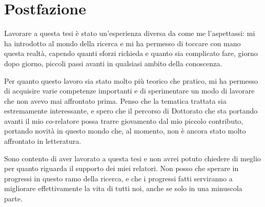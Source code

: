 \cleardoublepage
\renewcommand{\headrulewidth}{0pt}
\rhead{}
\thispagestyle{plain}
\begingroup
\let\clearpage\endgroup
\null{}

\chapter*{\centering Postfazione}

Lavorare a questa tesi è stato un'esperienza diversa da come me l'aspettassi: mi ha introdotto al mondo della ricerca e mi ha permesso di toccare con mano questa realtà, capendo quanti sforzi richieda e quanto sia complicato fare, giorno dopo giorno, piccoli passi avanti in qualsiasi ambito della conoscenza.

Per quanto questo lavoro sia stato molto più teorico che pratico, mi ha permesso di acquisire varie competenze importanti e di sperimentare un modo di lavorare che non avevo mai affrontato prima. Penso che la tematica trattata sia estremamente interessante, e spero che il percorso di Dottorato che sta portando avanti il mio co-relatore possa trarre giovamento dal mio piccolo contributo, portando novità in questo mondo che, al momento, non è ancora stato molto affrontato in letteratura.

Sono contento di aver lavorato a questa tesi e non avrei potuto chiedere di meglio per quanto riguarda il supporto dei miei relatori. Non posso che sperare in progressi in questo ramo della ricerca, e che i progressi fatti serviranno a migliorare effettivamente la vita di tutti noi, anche se solo in una minuscola parte.

 \null
\clearpage
\renewcommand{\headrulewidth}{0pt}
\thispagestyle{plain}
\rhead{}